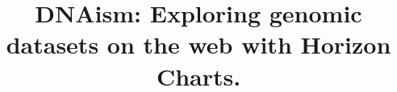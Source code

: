 \documentclass[twocolumn]{bmcart}
\begin{document}
\begin{frontmatter}

\begin{fmbox}

\title{DNAism: Exploring genomic datasets on the web with Horizon Charts. }


\author[
   addressref={aff1},                   %
   corref={aff1},                       %
   email={deiros@bcm.edu}   %
]{ }
\author[
   addressref={aff1,aff2},
   email={deiros@bcm.edu}
]{ }
\author[
   addressref={aff1,aff2},
   email={deiros@bcm.edu}
]{ }


\address[id=aff1]{%
  , %
  ,                     %
  ,                              %
}

\address[id=aff2]{%
  ,
  ,                     %
  ,                              %
}




\end{fmbox}
\end{frontmatter}
\end{document}
